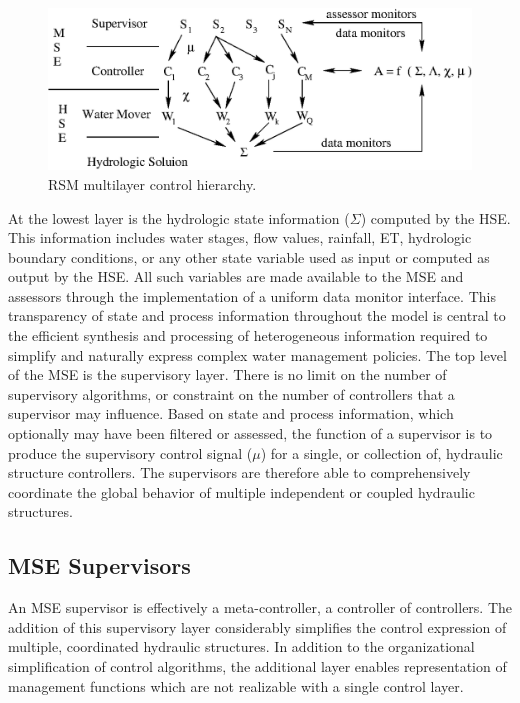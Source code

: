 \begin{figure}
 \begin{center}
  \includegraphics[scale=.85]{Graphics/multiLayerHierarchy.eps}
 \end{center}
 \caption{\label{fig:multiLayerHierarchy} RSM multilayer control hierarchy.}
\end{figure}

At the lowest layer is the hydrologic state information ($\Sigma$)
computed by the HSE. This information includes water stages, flow
values, rainfall, ET, hydrologic boundary conditions, or any other
state variable used as input or computed as output by the HSE. All
such variables are made available to the MSE and assessors through the
implementation of a uniform data monitor interface. This transparency
of state and process information throughout the model is central to
the efficient synthesis and processing of heterogeneous information
required to simplify and naturally express complex water management
policies.  The top level of the MSE is the supervisory layer. There is
no limit on the number of supervisory algorithms, or constraint on the
number of controllers that a supervisor may influence. Based on state
and process information, which optionally may have been filtered or
assessed, the function of a supervisor is to produce the supervisory
control signal ($\mu$) for a single, or collection of, hydraulic
structure controllers. The supervisors are therefore able to
comprehensively coordinate the global behavior of multiple independent
or coupled hydraulic structures.

\subsection{MSE Supervisors}
An MSE supervisor is effectively a meta-controller, a controller of
controllers. The addition of this supervisory layer considerably
simplifies the control expression of multiple, coordinated hydraulic
structures. In addition to the organizational simplification of
control algorithms, the additional layer enables representation of
management functions which are not realizable with a single control
layer.

